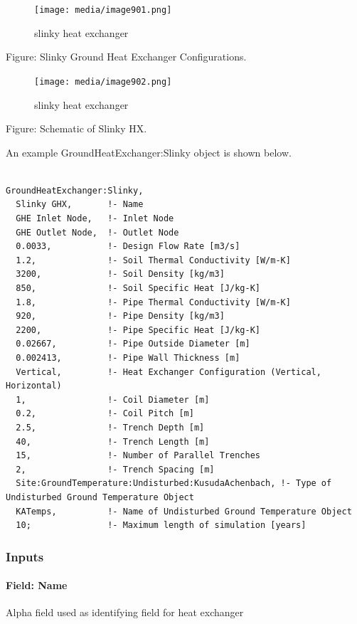 \begin{figure}[htbp]
\centering
\texttt{[image: media/image901.png]}
\caption{slinky heat exchanger}
\end{figure}

Figure: Slinky Ground Heat Exchanger Configurations.

\begin{figure}[htbp]
\centering
\texttt{[image: media/image902.png]}
\caption{slinky heat exchanger}
\end{figure}

Figure: Schematic of Slinky HX.

An example GroundHeatExchanger:Slinky object is shown below.

\begin{lstlisting}

GroundHeatExchanger:Slinky,
  Slinky GHX,       !- Name
  GHE Inlet Node,   !- Inlet Node
  GHE Outlet Node,  !- Outlet Node
  0.0033,           !- Design Flow Rate [m3/s]
  1.2,              !- Soil Thermal Conductivity [W/m-K]
  3200,             !- Soil Density [kg/m3]
  850,              !- Soil Specific Heat [J/kg-K]
  1.8,              !- Pipe Thermal Conductivity [W/m-K]
  920,              !- Pipe Density [kg/m3]
  2200,             !- Pipe Specific Heat [J/kg-K]
  0.02667,          !- Pipe Outside Diameter [m]
  0.002413,         !- Pipe Wall Thickness [m]
  Vertical,         !- Heat Exchanger Configuration (Vertical, Horizontal)
  1,                !- Coil Diameter [m]
  0.2,              !- Coil Pitch [m]
  2.5,              !- Trench Depth [m]
  40,               !- Trench Length [m]
  15,               !- Number of Parallel Trenches
  2,                !- Trench Spacing [m]
  Site:GroundTemperature:Undisturbed:KusudaAchenbach, !- Type of Undisturbed Ground Temperature Object
  KATemps,          !- Name of Undisturbed Ground Temperature Object
  10;               !- Maximum length of simulation [years]
\end{lstlisting}

\subsubsection{Inputs}\label{inputs-11-002}

\paragraph{Field: Name}\label{field-name-10-002}

Alpha field used as identifying field for heat exchanger

